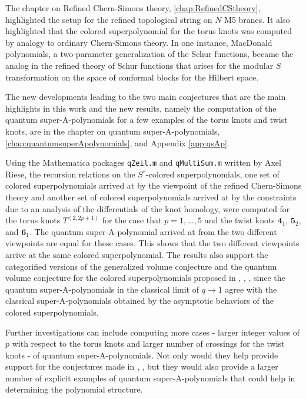 \documentclass[a4paper,titlepage,twoside]{book}
\begin{document}
The chapter on Refined Chern-Simons theory, \ref{chap:RefinedCStheory}, highlighted the setup for the refined topological string on $N$ M5 branes.  It also highlighted that the colored superpolynomial for the torus knots was computed by analogy to ordinary Chern-Simons theory.  In one instance, MacDonald polynomials, a two-parameter generalization of the Schur functions, became the analog in the refined theory of Schur functions that arises for the modular $S$ transformation on the space of conformal blocks for the Hilbert space.  

The new developments leading to the two main conjectures that are the main highlights in this work and the new results, namely the computation of the quantum super-A-polynomials for a few examples of the torus knots and twist knots, are in the chapter on quantum super-A-polynomials, \ref{chap:quantumsuperApolynomials}, and Appendix \ref{app:qsAp}.  

Using the Mathematica packages \texttt{qZeil.m} and \texttt{qMultiSum.m} written by Axel Riese, the recursion relations on the $S^r$-colored superpolynomials, one set of colored superpolynomials arrived at by the viewpoint of the refined Chern-Simons theory and another set of colored superpolynomials arrived at by the constraints due to an analysis of the differentials of the knot homology, were computed for the torus knots $T^{(2,2p+1)}$ for the case that $p=1, \dots, 5$ and the twist knots $\mathbf{4}_1$, $\mathbf{5}_2$, and $\mathbf{6}_1$.  The quantum super-A-polynomial arrived at from the two different viewpoints are equal for these cases.  This shows that the two different viewpoints arrive at the same colored superpolynomial.  The results also support the categorified versions of the generalized volume conjecture and the quantum volume conjecture for the colored superpolynomials proposed in \cite{bib:FGS2012}, \cite{FujiSulkowski2013}, \cite{FujiGukovSulkowski2012},  since the quantum super-A-polynomials in the classical limit of $q\to 1$ agree with the classical super-A-polynomials obtained by the asymptotic behaviors of the colored superpolynomials.  

Further investigations can include computing more cases - larger integer values of $p$ with respect to the torus knots and larger number of crossings for the twist knots - of quantum super-A-polynomials.  Not only would they help provide support for the conjectures made in \cite{bib:FGS2012}, \cite{FujiSulkowski2013}, but they would also provide a larger number of explicit examples of quantum super-A-polynomials that could help in determining the polynomial structure.  
\end{document}
